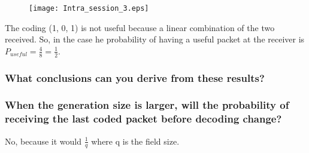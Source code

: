 \begin{figure}[!h]
  \centering
  \texttt{[image: Intra\_session\_3.eps]}
  \caption{}
  \label{fig:Intra_session_3}
\end{figure}
The coding (1, 0, 1) is not useful because a linear combination of the two received. So, in the case he probability of having a useful packet at the receiver is $P_{useful}=\frac{4}{8}=\frac{1}{2}$.\\
\subsubsection{What conclusions can you derive from these results?}

\subsubsection{When the generation size is larger, will the probability of receiving the last coded packet before decoding change?}
No, because it would $\frac{1}{q}$ where q is the field size.

